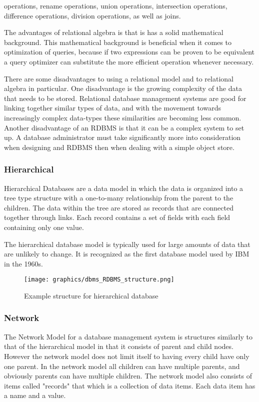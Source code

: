 \documentclass[letterpaper, 12pt]{article}
\begin{document}
operations, rename operations, union operations, intersection operations, difference
operations, division operations, as well as joins. 
\par\vspace{\baselineskip}
The advantages of relational algebra is that is has a solid mathematical background. 
This mathematical background is beneficial when it comes to optimization of queries,
because if two expressions can be proven to be equivalent a query optimizer can 
substitute the more efficient operation whenever necessary.
\par\vspace{\baselineskip}
There are some disadvantages to using a relational model and to relational algebra in
particular. One disadvantage is the growing complexity of the data that needs to be 
stored. Relational database management systems are good for linking together similar types
of data, and with the movement towards increasingly complex data-types these similarities 
are becoming less common. Another disadvantage of an RDBMS is that it can be a complex
system to set up. A database administrator must take significantly more into consideration
when designing and RDBMS then when dealing with a simple object store. 

\subsubsection{Hierarchical}
Hierarchical Databases are a data model in which the data is organized into a tree type 
structure with a one-to-many relationship from the parent to the children. The data 
within the tree are stored as records that are connected together through links. Each
record contains a set of fields with each field containing only one value. 
\par\vspace{\baselineskip}
The hierarchical database model is typically used for large amounts of data that are 
unlikely to change. It is recognized as the first database model used by IBM in 
the 1960s.\cite{hierarchical_dbms_techopedia}
\par\vspace{\baselineskip}
\begin{figure}
  \centering
  \texttt{[image: graphics/dbms\_RDBMS\_structure.png]}
  \caption{Example structure for hierarchical database}
\end{figure}

\subsubsection{Network}
The Network Model for a database management system is structures similarly to that of the
hierarchical model in that it consists of parent and child nodes. However the network 
model does not limit itself to having every child have only one parent. In the network 
model all children can have multiple parents, and obviously parents can have multiple 
children. The network model also consists of items called "records" that which is a 
collection of data items. Each data item has a name and a value. 
\end{document}

